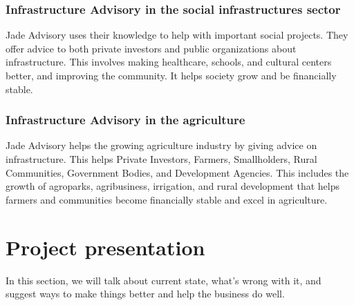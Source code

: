 \subsubsection*{Infrastructure Advisory in the social infrastructures sector}
Jade Advisory uses their knowledge to help with important social projects. They offer advice to both private investors and public organizations about infrastructure. This involves making healthcare, schools, and cultural centers better, and improving the community. It helps society grow and be financially stable.



\subsubsection*{Infrastructure Advisory in the agriculture}
Jade Advisory helps the growing agriculture industry by giving advice on infrastructure. This helps Private Investors, Farmers, Smallholders, Rural Communities, Government Bodies, and Development Agencies. This includes the growth of agroparks, agribusiness, irrigation, and rural development that helps farmers and communities become financially stable and excel in agriculture.

\section{Project presentation}
In this section, we will talk about current state, what's wrong with it, and suggest ways to make things better and help the business do well.

